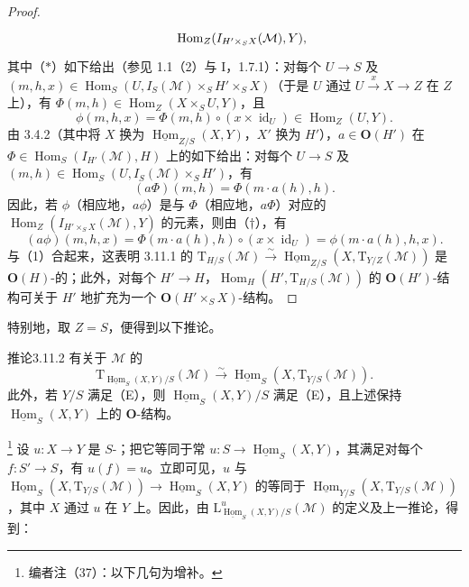 \begin{proof}
\[{\begin{tikzcd}[ampersand replacement=\&,column sep=small,row sep=large]
\&\operatorname{Hom}_Z(I_{H'\times_S X}(\mathcal M),Y),
\end{tikzcd}}
\]
其中（$*$）如下给出（参见 1.1（2）与 I，1.7.1）：对每个 $U\to S$ 及 $(m,h,x)\in\operatorname{Hom}_S(U,I_S(\mathcal M)\times_S H'\times_S X)$（于是 $U$ 通过 $U\xrightarrow x X\to Z$ 在 $Z$ 上），有 $\Phi(m,h)\in\operatorname{Hom}_Z(X\times_S U,Y)$，且
\[
\phi(m,h,x)=\Phi(m,h)\circ(x\times\operatorname{id}_U)\in\operatorname{Hom}_Z(U,Y).\tag{$\dagger$}
\]
由 3.4.2（其中将 $X$ 换为 $\underline{\operatorname{Hom}}_{Z/S}(X,Y)$，$X'$ 换为 $H'$），$a\in\mathbf O(H')$ 在 $\Phi\in\operatorname{Hom}_S(I_{H'}(\mathcal M),H)$ 上的如下给出：对每个 $U\to S$ 及 $(m,h)\in\operatorname{Hom}_S(U,I_S(\mathcal M)\times_S H')$，有
\[
(a\Phi)(m,h)=\Phi(m\cdot a(h),h).
\]
因此，若 $\phi$（相应地，$a\phi$）是与 $\Phi$（相应地，$a\Phi$）对应的 $\operatorname{Hom}_Z(I_{H'\times_S X}(\mathcal M),Y)$ 的元素，则由（$\dagger$），有
\[
(a\phi)(m,h,x)=\Phi(m\cdot a(h),h)\circ(x\times\operatorname{id}_U)
=\phi(m\cdot a(h),h,x).\tag{2}
\]
与（1）合起来，这表明 3.11.1 的 $\mathrm T_{H/S}(\mathcal M)\xrightarrow\sim\underline{\operatorname{Hom}}_{Z/S}(X,\mathrm T_{Y/Z}(\mathcal M))$ 是 $\mathbf O(H)$-的；此外，对每个 $H'\to H$，$\operatorname{Hom}_H(H',\mathrm T_{H/S}(\mathcal M))$ 的 $\mathbf O(H')$-结构可关于 $H'$ 地扩充为一个 $\mathbf O(H'\times_S X)$-结构。
\end{proof}
特别地，取 $Z=S$，便得到以下推论。
\begin{SGAresult}{推论}{3.11.2}
有关于 $\mathcal M$ 的
\[
\mathrm T_{\underline{\operatorname{Hom}}_S(X,Y)/S}(\mathcal M)
\xrightarrow\sim\underline{\operatorname{Hom}}_S(X,\mathrm T_{Y/S}(\mathcal M)).
\]
此外，若 $Y/S$ 满足（E），则 $\underline{\operatorname{Hom}}_S(X,Y)/S$ 满足（E），且上述保持 $\underline{\operatorname{Hom}}_S(X,Y)$ 上的 $\mathbf O$-结构。
\end{SGAresult}
\footnote{编者注（37）：以下几句为增补。} 设 $u:X\to Y$ 是 $S$-；把它等同于常 $u:S\to\underline{\operatorname{Hom}}_S(X,Y)$，其满足对每个 $f:S'\to S$，有 $u(f)=u$。立即可见，$u$ 与 $\underline{\operatorname{Hom}}_S(X,\mathrm T_{Y/S}(\mathcal M))\to\underline{\operatorname{Hom}}_S(X,Y)$ 的等同于 $\underline{\operatorname{Hom}}_{Y/S}(X,\mathrm T_{Y/S}(\mathcal M))$，其中 $X$ 通过 $u$ 在 $Y$ 上。因此，由 $\mathrm L^u_{\underline{\operatorname{Hom}}_S(X,Y)/S}(\mathcal M)$ 的定义及上一推论，得到：
